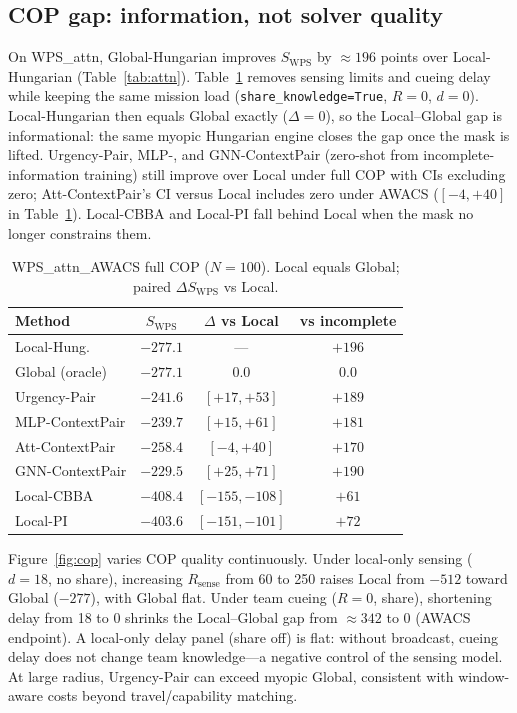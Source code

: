 \documentclass[journal,twocolumn,10pt]{IEEEtran}
\begin{document}
\subsection{COP gap: information, not solver quality}
\label{sec:cop}
On WPS\_attn, Global-Hungarian improves \(S_{\mathrm{WPS}}\) by \(\approx 196\) points over Local-Hungarian (Table~\ref{tab:attn}).
Table~\ref{tab:awacs} removes sensing limits and cueing delay while keeping the same mission load (\texttt{share\_knowledge=True}, \(R{=}0\), \(d{=}0\)).
Local-Hungarian then equals Global exactly (\(\Delta{=}0\)), so the Local--Global gap is informational: the same myopic Hungarian engine closes the gap once the mask is lifted.
Urgency-Pair, MLP-, and GNN-ContextPair (zero-shot from incomplete-information training) still improve over Local under full COP with CIs excluding zero; Att-ContextPair's CI versus Local includes zero under AWACS (\([-4,+40]\) in Table~\ref{tab:awacs}).
Local-CBBA and Local-PI fall behind Local when the mask no longer constrains them.

\begin{table}[t]
\centering
\caption{WPS\_attn\_AWACS full COP (\(N{=}100\)). Local equals Global; paired \(\Delta S_{\mathrm{WPS}}\) vs Local.}
\label{tab:awacs}
\setlength{\tabcolsep}{3pt}
\begin{tabular}{lccc}
\toprule
Method & \(S_{\mathrm{WPS}}\) & \(\Delta\) vs Local & vs incomplete \\
\midrule
Local-Hung. & $-277.1$ & --- & $+196$ \\
Global (oracle) & $-277.1$ & $0.0$ & $0.0$ \\
Urgency-Pair & $-241.6$ & $[+17,+53]$ & $+189$ \\
MLP-ContextPair & $-239.7$ & $[+15,+61]$ & $+181$ \\
Att-ContextPair & $-258.4$ & $[-4,+40]$ & $+170$ \\
GNN-ContextPair & $-229.5$ & $[+25,+71]$ & $+190$ \\
Local-CBBA & $-408.4$ & $[-155,-108]$ & $+61$ \\
Local-PI & $-403.6$ & $[-151,-101]$ & $+72$ \\
\bottomrule
\end{tabular}
\end{table}

Figure~\ref{fig:cop} varies COP quality continuously.
Under local-only sensing (\(d{=}18\), no share), increasing \(R_{\mathrm{sense}}\) from 60 to 250 raises Local from \(-512\) toward Global (\(-277\)), with Global flat.
Under team cueing (\(R{=}0\), share), shortening delay from 18 to 0 shrinks the Local--Global gap from \(\approx 342\) to \(0\) (AWACS endpoint).
A local-only delay panel (share off) is flat: without broadcast, cueing delay does not change team knowledge---a negative control of the sensing model.
At large radius, Urgency-Pair can exceed myopic Global, consistent with window-aware costs beyond travel/capability matching.
\end{document}
